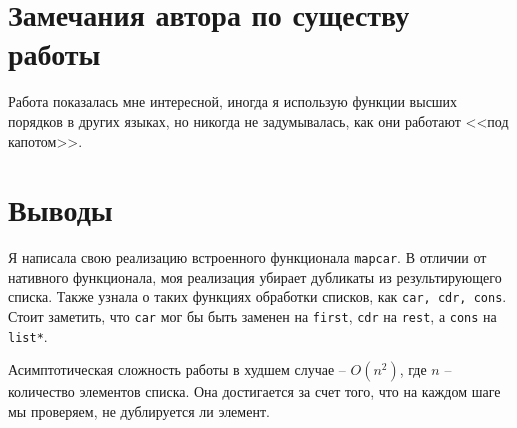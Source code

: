 \documentclass[12pt]{article}
\begin{document}
\section{Замечания автора по существу работы}
Работа показалась мне интересной, иногда я использую функции высших порядков в других языках, но никогда не задумывалась, как они работают <<под капотом>>.

\section{Выводы}
Я написала свою реализацию встроенного функционала {\tt mapcar}. В отличии от нативного функционала, моя реализация убирает дубликаты из результирующего списка. Также узнала о таких функциях обработки списков, как {\tt car, cdr, cons}.
Стоит заметить, что {\tt car} мог бы быть заменен на {\tt first}, {\tt cdr} на {\tt rest}, а {\tt cons} на {\tt list*}.

Асимптотическая сложность работы в худшем случае -- $O(n^{2})$, где $n$ -- количество элементов списка. Она достигается за счет того, что на каждом шаге мы проверяем, не дублируется ли элемент. 
\end{document}
